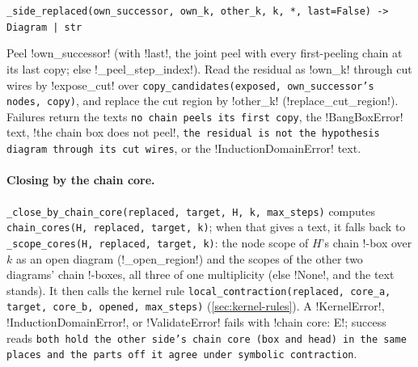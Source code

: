 \begin{signature}
\texttt{\_\allowbreak{}side\_\allowbreak{}replaced(\allowbreak{}own\_\allowbreak{}successor,\allowbreak{} own\_\allowbreak{}k,\allowbreak{} other\_\allowbreak{}k,\allowbreak{} k,\allowbreak{} *,\allowbreak{} last=False) -> Diagram | str}

Peel \code!own_successor! (with \code!last!, the joint peel with every first-peeling chain at its last copy; else \py!_peel_step_index!). Read the residual as \code!own_k! through cut wires by \py!expose_cut! over \texttt{copy\_\allowbreak{}candidates(\allowbreak{}exposed,\allowbreak{} own\_\allowbreak{}successor's nodes,\allowbreak{} copy)}, and replace the cut region by \code!other_k! (\py!replace_cut_region!). Failures return the texts \texttt{no chain peels its first copy}, the \py!BangBoxError! text, \code!the chain box does not peel!, \texttt{the residual is not the hypothesis diagram through its cut wires}, or the \py!InductionDomainError! text.
\end{signature}

\paragraph{Closing by the chain core.} \texttt{\_\allowbreak{}close\_\allowbreak{}by\_\allowbreak{}chain\_\allowbreak{}core(\allowbreak{}replaced,\allowbreak{} target,\allowbreak{} H,\allowbreak{} k,\allowbreak{} max\_\allowbreak{}steps)} computes \texttt{chain\_\allowbreak{}cores(\allowbreak{}H,\allowbreak{} replaced,\allowbreak{} target,\allowbreak{} k)}; when that gives a text, it falls back to \texttt{\_\allowbreak{}scope\_\allowbreak{}cores(\allowbreak{}H,\allowbreak{} replaced,\allowbreak{} target,\allowbreak{} k)}: the node scope of $H$'s chain !-box over $k$ as an open diagram (\py!_open_region!) and the scopes of the other two diagrams' chain !-boxes, all three of one multiplicity (else \py!None!, and the text stands). It then calls the kernel rule \texttt{local\_\allowbreak{}contraction(\allowbreak{}replaced,\allowbreak{} core\_\allowbreak{}a,\allowbreak{} target,\allowbreak{} core\_\allowbreak{}b,\allowbreak{} opened,\allowbreak{} max\_\allowbreak{}steps)} (\cref{sec:kernel-rules}). A \py!KernelError!, \py!InductionDomainError!, or \py!ValidateError! fails with \code!chain core: E!; success reads \texttt{both hold the other side's chain core (\allowbreak{}box and head) in the same places and the parts off it agree under symbolic contraction}.

